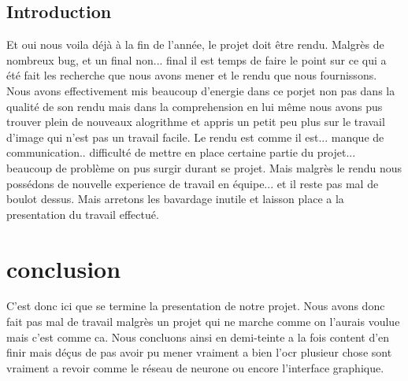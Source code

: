 \documentclass[12pt]{article}
\begin{document}
\subsection{Introduction}
Et oui nous voila déjà à la fin de l'année, le projet doit être rendu. Malgrès de nombreux bug, et un final non... final il est temps de faire le point sur ce qui a été fait les recherche que nous avons mener et le rendu que nous fournissons. Nous avons effectivement mis beaucoup d'energie dans ce porjet non pas dans la qualité de son rendu mais dans la comprehension en lui même nous avons pus trouver plein de nouveaux alogrithme et appris un petit peu plus sur le travail d'image qui n'est pas un travail facile. Le rendu est comme il est... manque de communication.. difficulté de mettre en place certaine partie du projet... beaucoup de problème on pus surgir durant se projet. Mais malgrès le rendu nous possédons de nouvelle experience de travail en équipe... et il reste pas mal de boulot dessus. Mais arretons les bavardage inutile et laisson place a la presentation du travail effectué.







\section{conclusion}
C'est donc ici que se termine la presentation de notre projet. Nous avons donc fait pas mal de travail malgrès un projet qui ne marche comme on l'aurais voulue mais c'est comme ca. Nous concluons ainsi en demi-teinte a la fois content d'en finir mais déçus de pas avoir pu mener vraiment a bien l'ocr plusieur chose sont vraiment a revoir comme le réseau de neurone ou encore l'interface graphique.
\end{document}
